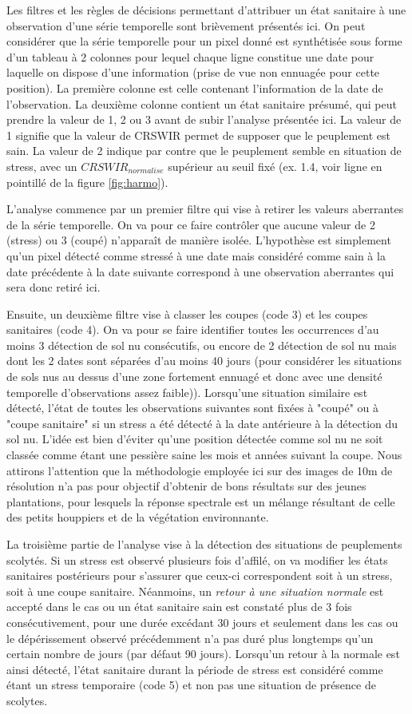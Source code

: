 \documentclass[a4paper, 12pt]{article} %
\begin{document}
Les filtres et les règles de décisions permettant d'attribuer un état sanitaire à une observation d'une série temporelle sont brièvement présentés ici. On peut considérer que la série temporelle pour un pixel donné est synthétisée sous forme d'un tableau à 2 colonnes pour lequel chaque ligne constitue une date pour laquelle on dispose d'une information (prise de vue non ennuagée pour cette position). La première colonne est celle contenant l'information de la date de l'observation. La deuxième colonne contient un état sanitaire présumé, qui peut prendre la valeur de 1, 2 ou 3 avant de subir l'analyse présentée ici. La valeur de 1 signifie que la valeur de CRSWIR permet de supposer que le peuplement est sain. La valeur de 2 indique par contre que le peuplement semble en situation de stress, avec un $CRSWIR_{normalise}$ supérieur au seuil fixé (ex. 1.4, voir ligne en pointillé de la figure \ref{fig:harmo}).

L'analyse commence par un premier filtre qui vise à retirer les valeurs aberrantes de la série temporelle. On va pour ce faire contrôler que aucune valeur de 2 (stress) ou 3 (coupé) n'apparaît de manière isolée. L'hypothèse est simplement qu'un pixel détecté comme stressé à une date mais considéré comme sain à la date précédente à la date suivante correspond à une observation aberrantes qui sera donc retiré ici.

Ensuite, un deuxième filtre vise à classer les coupes (code 3) et les coupes sanitaires (code 4). On va pour se faire identifier toutes les occurrences d'au moins 3 détection de sol nu consécutifs, ou encore de 2 détection de sol nu mais dont les 2 dates sont séparées d'au moins 40 jours (pour considérer les situations de sols nus au dessus d'une zone fortement ennuagé et donc avec une densité temporelle d'observations assez faible)). Lorsqu'une situation similaire est détecté, l'état de toutes les observations suivantes sont fixées à "coupé" ou à "coupe sanitaire" si un stress a été détecté à la date antérieure à la détection du sol nu. L'idée est bien d'éviter qu'une position détectée comme sol nu ne soit classée comme étant une pessière saine les mois et années suivant la coupe. Nous attirons l'attention que la méthodologie employée ici sur des images de 10m de résolution n'a pas pour objectif d'obtenir de bons résultats sur des jeunes plantations, pour lesquels la réponse spectrale est un mélange résultant de celle des petits houppiers et de la végétation environnante.

La troisième partie de l'analyse vise à la détection des situations de peuplements scolytés. Si un stress est observé plusieurs fois d'affilé, on va modifier les états sanitaires postérieurs pour s'assurer que ceux-ci correspondent soit à un stress, soit à une coupe sanitaire. Néanmoins, un \textit{retour à une situation normale} est accepté dans le cas ou un état sanitaire sain est constaté plus de 3 fois consécutivement, pour une durée excédant 30 jours et seulement dans les cas ou le dépérissement observé précédemment n'a pas duré plus longtemps qu'un certain nombre de jours (par défaut 90 jours). Lorsqu'un retour à la normale est ainsi détecté, l'état sanitaire durant la période de stress est considéré comme étant un stress temporaire (code 5) et non pas une situation de présence de scolytes.
\end{document}
